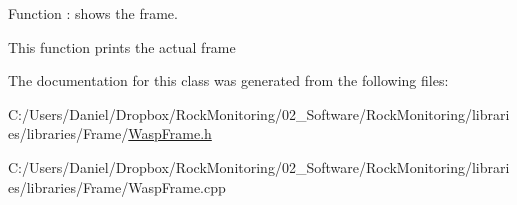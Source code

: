 Function \+: shows the frame. 

This function prints the actual frame 

The documentation for this class was generated from the following files\+:\begin{DoxyCompactItemize}
\item 
C\+:/\+Users/\+Daniel/\+Dropbox/\+Rock\+Monitoring/02\+\_\+\+Software/\+Rock\+Monitoring/libraries/libraries/\+Frame/\hyperlink{_wasp_frame_8h}{Wasp\+Frame.\+h}\item 
C\+:/\+Users/\+Daniel/\+Dropbox/\+Rock\+Monitoring/02\+\_\+\+Software/\+Rock\+Monitoring/libraries/libraries/\+Frame/Wasp\+Frame.\+cpp\end{DoxyCompactItemize}

